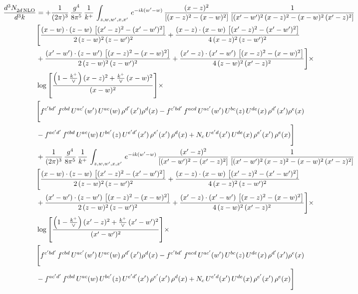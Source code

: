 \documentclass[10pt]{article}
\numberwithin{equation}{section}
\begin{document}
\begin{align}
 \frac{d^{3}N_{2d\,\rm NLO}^{\rm}}{d^{3}k}  & =   +\frac{1}{(2\pi)^{3}}\, \frac{g^{4}}{8\pi^{5}}\,\frac{1}{k^{+}}\,\int_{z,w,w^{\prime},x,x'}\, e^{-ik(w^{\prime}-w)}\,\frac{(x-z)^{2}}{\left[(x-z)^{2}-(x-w)^{2}\right]}\,\frac{1}{\left[(x'-w')^{2}\,(x-z)^{2} - (x-w)^{2}\,(x'-z)^{2}\right]}\notag \\ & \Bigg[\frac{(x-w)\cdot (z-w)\, \left[(x'-z)^{2}-(x'-w')^{2}\right]}{2\, (z-w)^{2}\, (z-w')^{2}}  + \frac{(x-z)\cdot (x-w)\,\left[(x'-z)^{2}-(x'-w')^{2}\right] }{4\,(x-z)^{2}\,(z-w')^{2}}\notag \\ & +\frac{(x'-w')\cdot (z-w')\, \left[(x-z)^{2}-(x-w)^{2}\right]}{2\, (z-w)^{2}\, (z-w')^{2}}+ \frac{(x'-z)\cdot (x'-w')\, \left[(x-z)^{2}-(x-w)^{2}\right]}{4\, (z-w)^{2}\,(x'-z)^{2}}\Bigg]\times\,\notag \\ & \log{\left[\frac{\left(1-\frac{k^{+}}{\vee}\right)(x-z)^{2}+\frac{k^{+}}{\vee}\,(x-w)^{2}}{(x-w)^{2}}\right]} \times\notag \\ & \Bigg[f^{c'bd'}\,f^{cbd}\, U^{ac'}(w')\,U^{ac}(w)\,\rho^{d'}(x')\rho^{d}(x)- f^{c'bd'}\,f^{acd}\,U^{ac'}(w')\,U^{bc}(z)\,U^{de}(x)\,\rho^{d'}(x')\rho^{e}(x) \notag \\ & -f^{ac'd'}\,f^{cbd}\,U^{ac}(w)\,U^{bc'}(z)\,U^{e'd'}(x')\,\rho^{e'}(x')\,\rho^{d}(x) +N_{c}\,U^{e'd}(x')\,U^{de}(x)\,\rho^{e'}(x')\,\rho^{e}(x)\Bigg] \notag \\
& +\frac{1}{(2\pi)^{3}}\, \frac{g^{4}}{8\pi^{5}}\,\frac{1}{k^{+}}\,\int_{z,w,w^{\prime},x,x'}\, e^{-ik(w^{\prime}-w)}\,\frac{(x'-z)^{2}}{\left[(x'-w')^{2}-(x'-z)^{2}\right]}\,\frac{1}{\left[(x'-w')^{2}\,(x-z)^{2} - (x-w)^{2}\,(x'-z)^{2}\right]}\notag \\ & \Bigg[\frac{(x-w)\cdot (z-w)\, \left[(x'-z)^{2}-(x'-w')^{2}\right]}{2\, (z-w)^{2}\, (z-w')^{2}}  + \frac{(x-z)\cdot (x-w)\,\left[(x'-z)^{2}-(x'-w')^{2}\right] }{4\,(x-z)^{2}\,(z-w')^{2}}\notag \\ & +\frac{(x'-w')\cdot (z-w')\, \left[(x-z)^{2}-(x-w)^{2}\right]}{2\, (z-w)^{2}\, (z-w')^{2}}+ \frac{(x'-z)\cdot (x'-w')\, \left[(x-z)^{2}-(x-w)^{2}\right]}{4\, (z-w)^{2}\,(x'-z)^{2}}\Bigg]\times\,\notag \\ & \log{\left[\frac{\left(1-\frac{k^{+}}{\vee}\right)(x'-z)^{2}+\frac{k^{+}}{\vee}\,(x'-w')^{2}}{(x'-w')^{2}}\right]} \times\notag \\ & \Bigg[f^{c'bd'}\,f^{cbd}\, U^{ac'}(w')\,U^{ac}(w)\,\rho^{d'}(x')\rho^{d}(x)- f^{c'bd'}\,f^{acd}\,U^{ac'}(w')\,U^{bc}(z)\,U^{de}(x)\,\rho^{d'}(x')\rho^{e}(x) \notag \\ & -f^{ac'd'}\,f^{cbd}\,U^{ac}(w)\,U^{bc'}(z)\,U^{e'd'}(x')\,\rho^{e'}(x')\,\rho^{d}(x) +N_{c}\,U^{e'd}(x')\,U^{de}(x)\,\rho^{e'}(x')\,\rho^{e}(x)\Bigg]
\end{align}
\end{document}

